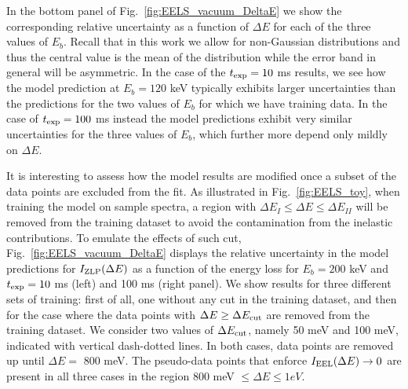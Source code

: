 In the bottom panel of Fig.~\ref{fig:EELS_vacuum_DeltaE} we show
the corresponding relative uncertainty as a function of $\Delta E$
for each of the three values of $E_b$.
%
Recall that in this work we allow for non-Gaussian distributions and thus the central
value is the mean of the distribution while the error band in general will
be asymmetric.
%
In the case of the $t_{\rm exp}=10$ ms results, we see how the model prediction
at $E_b=120$ keV typically exhibits larger uncertainties than the predictions
for the two values of $E_b$ for which we have training data.
%
In the case of $t_{\rm exp}=100$ ms instead the model predictions exhibit very similar
uncertainties for the three values of $E_b$, which further more depend only mildly on $\Delta E$.

It is interesting to assess how the model results are modified once a subset of the data points
are excluded from the fit.
%
As illustrated in Fig.~\ref{fig:EELS_toy}, when training the model on sample spectra, a region
with $\Delta E_I \le \Delta E \le \Delta E_{II}$ will be removed from the training dataset to avoid the
contamination from the inelastic contributions.
%
To emulate the effects of such cut, 
Fig.~\ref{fig:EELS_vacuum_DeltaE} displays
the relative uncertainty in the model predictions for $I_{\rm ZLP}(\Delta E)$
as a function of the energy loss for $E_b=200$ keV and $t_{\rm exp}=10$ ms (left)
and 100 ms (right panel).
%
We show results for three different sets of training: first of all, one without any cut
in the training dataset, and then for the case where the data points with $\Delta E \ge \Delta E_{\rm cut}$
are removed from the training dataset.
%
We consider two values of $\Delta E_{\rm cut}$, namely 50 meV and 100 meV, indicated
with vertical dash-dotted lines.
%
In both cases, data points are removed up until $\Delta E =$ 800 meV. The pseudo-data points 
that enforce $I_{\rm EEL}(\Delta E)\to 0$ are present
in all three cases in the region 800 meV $\le \Delta E \le 1 eV$. 

